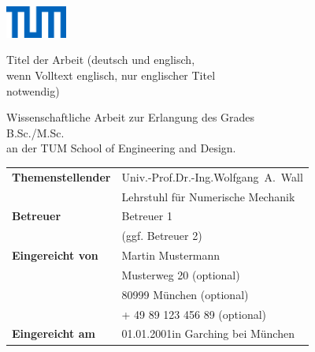 \documentclass[12pt,a4paper]{article}
\makeatletter
\newcommand{\DateOfSubmission}{01.01.2001}
\newcommand{\insertblankpage}{\mbox{}\thispagestyle{empty}\addtocounter{page}{-1}\newpage}
\renewcommand{\cleardoublepage}{\clearpage\if@twoside \ifodd\c@page\else
  \hbox{}
  \vspace*{\fill}
  \thispagestyle{empty}
  \newpage
  \if@twocolumn\hbox{}\newpage\fi\fi\fi}
\newenvironment{changemargin}[2]{%
\begin{list}{}{%
\setlength{\topsep}{0pt}%
\setlength{\leftmargin}{#1}%
\setlength{\rightmargin}{#2}%
\setlength{\listparindent}{\parindent}%
\setlength{\itemindent}{\parindent}%
\setlength{\parsep}{\parskip}%
}%
\item[]}{\end{list}}
\makeatother
\begin{document}

\cleardoublepage
\insertblankpage
\thispagestyle{empty}
\begin{changemargin}{-1.0cm}{-1.0cm}

\begin{flushright}
	\includegraphics[width=20mm]{fig/tum.png}
\end{flushright}
\vspace*{5mm}

{\sffamily
\Huge {\noindent
	Titel der Arbeit (deutsch und englisch,\\
  wenn Volltext englisch, nur englischer Titel\\ 
  notwendig)}

\vspace*{4cm}

\large {\noindent
	Wissenschaftliche Arbeit zur Erlangung des Grades \\[1mm]
	B.Sc./M.Sc. \\[1mm]
	an der TUM School of Engineering and Design.
}
\vspace*{1.5cm}

{%
\normalsize
\begin{onehalfspacing}
\begin{raggedright}
  \begin{tabular}{ll}
  	\textbf{Themenstellender} & Univ.-Prof.\@ Dr.-Ing.\@ Wolfgang\ A.\ Wall \\
  	& Lehrstuhl f\"ur Numerische Mechanik \\[5mm]
  	\textbf{Betreuer} & Betreuer 1  \\
  	& (ggf. Betreuer 2) \\[5mm]
  	\textbf{Eingereicht von} & Martin Mustermann \\
  	& Musterweg 20 (optional)\\
  	& 80999 M\"unchen (optional)\\
  	& + 49 89 123 456 89 (optional)\\[5mm]
	\textbf{Eingereicht am} & \DateOfSubmission in Garching bei M\"unchen \\
\end{tabular}
\end{raggedright}
\end{onehalfspacing}
}
}
\end{changemargin}
\end{document}
